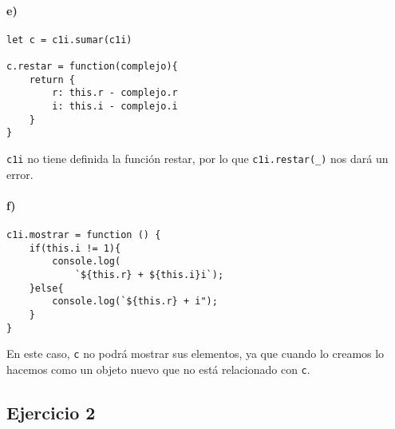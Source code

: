 \documentclass[10pt,a4paper]{article}
\begin{document}
\begin{multicols}{2}

\paragraph{e)}
\begin{centrado2}
\begin{verbatim}
let c = c1i.sumar(c1i)

c.restar = function(complejo){
    return {
        r: this.r - complejo.r
        i: this.i - complejo.i
    }
}
\end{verbatim}
\end{centrado2}
\texttt{c1i} no tiene definida la función restar, por lo que \texttt{c1i.restar(\_)} nos dará un error.
\vfill\null
\columnbreak
\paragraph{f)}
\begin{verbatim}
c1i.mostrar = function () {
    if(this.i != 1){
        console.log(
            `${this.r} + ${this.i}i`);
    }else{
        console.log(`${this.r} + i");
    }
}
\end{verbatim}

En este caso, \texttt{c} no podrá mostrar sus elementos, ya que cuando lo creamos lo hacemos como un objeto nuevo que no está relacionado con \texttt{c}.

\end{multicols}

\newpage
\subsection{Ejercicio 2}
\end{document}
